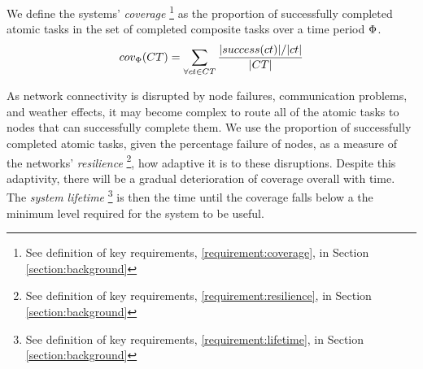 We define the systems' \textit{ coverage} \footnote{See definition of key requirements, \ref{requirement:coverage}, in Section \ref{section:background}} as the proportion of successfully completed atomic tasks in the set of completed composite tasks over a time period $\Phi$.
\begin{equation}
	\label{eq:coverage}
	\functionSystemCoverage{}{} = \sum\limits_{\forall \varCompositeTask{}{} \in \setCompositeTask{}{}} 
	\frac
	{\funcSize{\functionTasksSuccess{\varCompositeTask{}{}}{}}/\funcSize{\varCompositeTask{}{}}}
	{\funcSize{\setCompositeTask{}{}}{}}
\end{equation}

As network connectivity is disrupted by node failures, communication problems, and weather effects, it may become complex to route all of the atomic tasks to nodes that can successfully complete them. We use the proportion of successfully completed atomic tasks, given the percentage failure of nodes, as a measure of the networks' \textit{resilience} \footnote{See definition of key requirements, \ref{requirement:resilience}, in Section \ref{section:background}}, how adaptive it is to these disruptions. Despite this adaptivity, there will be a gradual deterioration of coverage overall with time. The \textit{system lifetime} \footnote{See definition of key requirements, \ref{requirement:lifetime}, in Section \ref{section:background}} is then the time until the coverage falls below a the minimum level required for the system to be useful. 